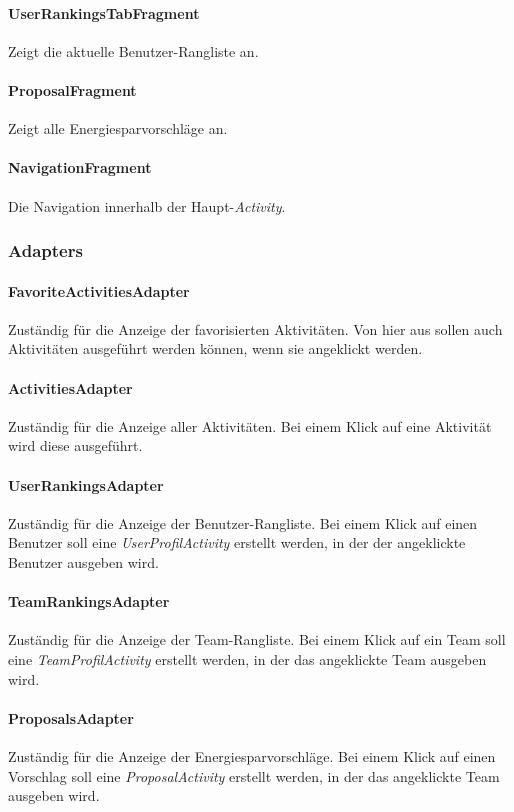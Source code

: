 \paragraph{UserRankingsTabFragment} Zeigt die aktuelle Benutzer-Rangliste an.
\paragraph{ProposalFragment} Zeigt alle Energiesparvorschläge an.
\paragraph{NavigationFragment} Die Navigation innerhalb der Haupt-\emph{Activity}.

\subsubsection{Adapters}
\paragraph{FavoriteActivitiesAdapter} Zuständig für die Anzeige der favorisierten Aktivitäten. Von hier aus sollen auch Aktivitäten ausgeführt werden können, wenn sie angeklickt werden.
\paragraph{ActivitiesAdapter} Zuständig für die Anzeige aller Aktivitäten. Bei einem Klick auf eine Aktivität wird diese ausgeführt.
\paragraph{UserRankingsAdapter} Zuständig für die Anzeige der Benutzer-Rangliste. Bei einem Klick auf einen Benutzer soll eine \emph{UserProfilActivity} erstellt werden, in der der angeklickte Benutzer ausgeben wird.
\paragraph{TeamRankingsAdapter} Zuständig für die Anzeige der Team-Rangliste. Bei einem Klick auf ein Team soll eine \emph{TeamProfilActivity} erstellt werden, in der das angeklickte Team ausgeben wird.
\paragraph{ProposalsAdapter} Zuständig für die Anzeige der Energiesparvorschläge. Bei einem Klick auf einen Vorschlag soll eine \emph{ProposalActivity} erstellt werden, in der das angeklickte Team ausgeben wird.

